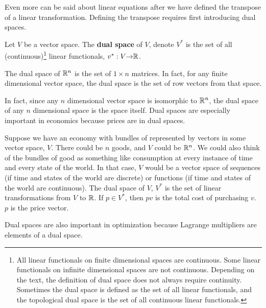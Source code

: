 Even more can be said about linear equations after we have defined the
transpose of a linear transformation.  Defining the transpose requires
first introducing dual spaces. 
\begin{definition}
  Let $V$ be a vector space. The \textbf{dual space} of $V$, denote
  $V^\ast$ is the set of all (continuous)\footnote{All linear
    functionals on finite dimensional spaces are continuous. Some
    linear functionals on infinite dimensional spaces are not
    continuous. Depending on the text, the definition of dual space
    does not always require continuity. Sometimes the dual space is
    defined as the set of all linear functionals, and the topological
    dual space is the set of all continuous linear functionals.}
  linear functionals, 
  $v^\ast: V {\rightarrow} \mathbb{R}$.
\end{definition}
\begin{example}\label{ex:rdual}
  The dual space of $\mathbb{R}^n$ is the set of $1 \times n$ matrices. In
  fact, for any finite dimensional vector space, the dual space is the
  set of row vectors from that space. 
\end{example}
In fact, since any $n$ dimensional vector space is isomorphic to
$\mathbb{R}^n$, the dual space of any $n$ dimensional space is the space
itself. Dual spaces are especially important in economics because
prices are in dual spaces.
\begin{example}
  Suppose we have an economy with bundles of represented by vectors in
  some vector space, $V$. There could be $n$ goods, and $V$ could be
  $\mathbb{R}^n$. We could also think of the bundles of good as something like
  consumption at every instance of time and every state of the
  world. In that case, $V$ would be a vector space of sequences (if
  time and states of the world are discrete) or functions (if time and
  states of the world are continuous). The dual space of $V$, $V^\ast$
  is the set of linear transformations from $V$ to $\mathbb{R}$. If $p \in
  V^\ast$, then $pv$ is the total cost of purchasing $v$. $p$ is the
  price vector.
\end{example}
Dual spaces are also important in optimization because Lagrange
multipliers are elements of a dual space.

